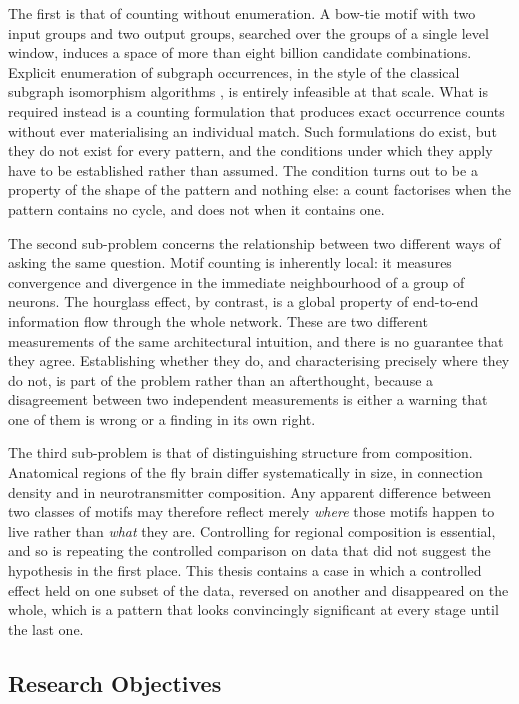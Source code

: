 \documentclass[12pt,a4paper,oneside]{article}
\theoremstyle{definition}
\theoremstyle{plain}
\begin{document}
The first is that of counting without enumeration. A bow-tie motif with two
input groups and two output groups, searched over the groups of a single
level window, induces a space of more than eight billion candidate
combinations. Explicit enumeration of subgraph occurrences, in the style of
the classical subgraph isomorphism algorithms \cite{ullmann1976,cordella2004},
is entirely infeasible at that scale. What is required instead is a counting
formulation that produces exact occurrence counts without ever materialising
an individual match. Such formulations do exist, but they do not exist for
every pattern, and the conditions under which they apply have to be
established rather than assumed. The condition turns out to be a property of
the shape of the pattern and nothing else: a count factorises when the
pattern contains no cycle, and does not when it contains one.

The second sub-problem concerns the relationship between two different ways
of asking the same question. Motif counting is inherently local: it measures
convergence and divergence in the immediate neighbourhood of a group of
neurons. The hourglass effect, by contrast, is a global property of
end-to-end information flow through the whole network. These are two
different measurements of the same architectural intuition, and there is no
guarantee that they agree. Establishing whether they do, and characterising
precisely where they do not, is part of the problem rather than an
afterthought, because a disagreement between two independent measurements is
either a warning that one of them is wrong or a finding in its own right.

The third sub-problem is that of distinguishing structure from composition.
Anatomical regions of the fly brain differ systematically in size, in
connection density and in neurotransmitter composition. Any apparent
difference between two classes of motifs may therefore reflect merely
\emph{where} those motifs happen to live rather than \emph{what} they are.
Controlling for regional composition is essential, and so is repeating the
controlled comparison on data that did not suggest the hypothesis in the
first place. This thesis contains a case in which a controlled effect held
on one subset of the data, reversed on another and disappeared on the whole,
which is a pattern that looks convincingly significant at every stage until
the last one.

\subsection{Research Objectives}
\label{sec:objectives}
\end{document}
